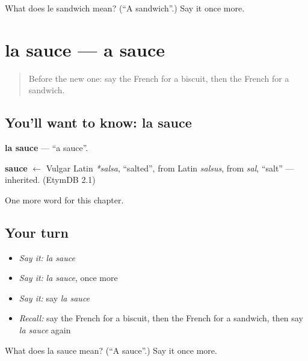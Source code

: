 \begin{tcolorbox}[breakable,colback=teal!4,colframe=teal!35!black,title={Before you move on}]
What does le sandwich mean? (\textquotedblleft{}A sandwich\textquotedblright{}.) Say it once more.
\end{tcolorbox}
\section[la sauce]{la sauce — a sauce}

\label{lesson:FR-C122-sauce}



\begin{quote}
Before the new one: say the French for a biscuit, then the French for a sandwich.
\end{quote}

\subsection*{You'll want to know: la sauce}
\textbf{la sauce} — \textquotedblleft{}a sauce\textquotedblright{}.

\begin{cousinweb}
\textbf{sauce} $\leftarrow$ Vulgar Latin \emph{*salsa}, \textquotedblleft{}salted\textquotedblright{}, from Latin \emph{salsus}, from \emph{sal}, \textquotedblleft{}salt\textquotedblright{} — inherited. (EtymDB 2.1)
\end{cousinweb}

\begin{grammarlens}[title={What you've built}]
One more word for this chapter.
\end{grammarlens}

\subsection*{Your turn}
\begin{itemize}
\raggedright
  \item \emph{Say it:} \emph{la sauce}
  \item \emph{Say it:} \emph{la sauce}, once more
  \item \emph{Say it:} say \emph{la sauce}
  \item \emph{Recall:} say the French for a biscuit, then the French for a sandwich, then say \emph{la sauce} again
\end{itemize}

\begin{tcolorbox}[breakable,colback=teal!4,colframe=teal!35!black,title={Before you move on}]
What does la sauce mean? (\textquotedblleft{}A sauce\textquotedblright{}.) Say it once more.
\end{tcolorbox}
